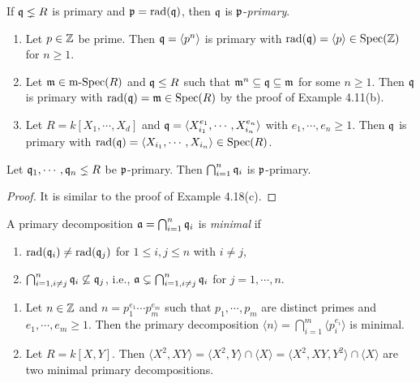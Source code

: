 \begin{definition}
    If $\mathfrak{q} \lneq R$ is primary and $\mathfrak{p} = \operatorname{rad}(\mathfrak{q})$, then $\mathfrak{q}$ is $\mathfrak{p}$-\emph{primary}.
\end{definition}

\begin{example}
    \begin{enumerate}
        \item Let $p \in \mathbb{Z}$ be prime. Then $\mathfrak{q} = \langle  p^{n} \rangle$ is primary with $\operatorname{rad}(\mathfrak{q}) = \langle p  \rangle \in \operatorname{Spec}(\mathbb{Z})$ for $n \geq 1$.
        \item 
            Let $\mathfrak{m} \in \operatorname{m-Spec}(R)$ and $\mathfrak{q} \leq R$ such that $\mathfrak{m}^{n} \subseteq \mathfrak{q} \subseteq \mathfrak{m}$ for some $n \geq 1$. Then $\mathfrak{q}$ is primary with $\operatorname{rad}(\mathfrak{q}) = \mathfrak{m} \in \operatorname{Spec}(R)$ by the proof of Example 4.11(b).
        \item Let $R = k[X_1,\cdots,X_d]$ and $\mathfrak{q} = \langle X_{i_1}^{e_{1}},\cdots,X_{i_n}^{e_{n}} \rangle$ with $e_1, \cdots, e_n \geq 1$. Then $\mathfrak{q}$ is primary with $\operatorname{rad}(\mathfrak{q}) = \langle X_{i_1},\cdots,X_{i_n} \rangle \in \operatorname{Spec}(R)$.
    \end{enumerate}
\end{example}

\begin{proposition}
    Let $\mathfrak{q}_1,\cdots,\mathfrak{q}_n \lneq R$ be $\mathfrak{p}$-primary. Then $\bigcap_{i=1}^{n} \mathfrak{q}_i$ is $\mathfrak{p}$-primary.
\end{proposition}

\begin{proof}
    It is similar to the proof of Example 4.18(c).
\end{proof}

\begin{definition}
    A primary decomposition $\mathfrak{a} = \bigcap_{i=1}^{n}\mathfrak{q}_i$ is \emph{minimal} if 
    \begin{enumerate}
        \item $\operatorname{rad}(\mathfrak{q}_i) \neq \operatorname{rad}(\mathfrak{q}_j)$ for $1 \leq i,j \leq n$ with $i \neq j$,
        \item $\bigcap_{i=1,i \neq j}^{n} \mathfrak{q}_i \not \subseteq \mathfrak{q}_j$, i.e., $\mathfrak{a} \subsetneq \bigcap_{i=1, i \neq j}^{n} \mathfrak{q}_i$ for $j = 1,\cdots,n$.
    \end{enumerate}
\end{definition}

\begin{example}
    \begin{enumerate}
        \item 
            Let $n \in \mathbb{Z}$ and $n = p_1^{e_1} \cdots p_m^{e_m}$ such that $p_1,\cdots,p_m$ are distinct primes and $e_1,\cdots,e_m \geq 1$. Then the primary decomposition $\langle n \rangle = \bigcap_{i=1}^{m} \langle p_i^{e_i} \rangle$ is minimal.
        \item Let $R = k[X,Y]$. Then $\langle X^{2},XY \rangle = \langle X^{2},Y \rangle \cap \langle X \rangle = \langle X^{2},XY,Y^{2} \rangle \cap \langle X \rangle$ are two minimal primary decompositions.
    \end{enumerate}
\end{example}

